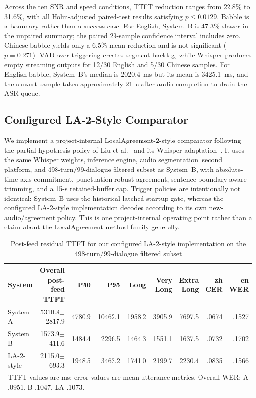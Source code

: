 \documentclass[conference]{IEEEtran}
\begin{document}
Across the ten SNR and speed conditions, TTFT reduction ranges from 22.8\% to 31.6\%, with all Holm-adjusted paired-test results satisfying $p\leq0.0129$. Babble is a boundary rather than a success case. For English, System~B is 47.3\% slower in the unpaired summary; the paired 29-sample confidence interval includes zero. Chinese babble yields only a 6.5\% mean reduction and is not significant ($p=0.271$). VAD over-triggering creates segment backlog, while Whisper produces empty streaming outputs for 12/30 English and 5/30 Chinese samples. For English babble, System~B's median is 2020.4~ms but its mean is 3425.1~ms, and the slowest sample takes approximately 21~s after audio completion to drain the ASR queue.

\subsection{Configured LA-2-Style Comparator}

We implement a project-internal LocalAgreement-2-style comparator following the partial-hypothesis policy of Liu et al.~\cite{liu2020partialhypothesis} and its Whisper adaptation~\cite{machacek2023turning}. It uses the same Whisper weights, inference engine, audio segmentation, second platform, and 498-turn/99-dialogue filtered subset as System~B, with absolute-time-axis commitment, punctuation-robust agreement, sentence-boundary-aware trimming, and a 15-s retained-buffer cap. Trigger policies are intentionally not identical: System~B uses the historical latched startup gate, whereas the configured LA-2-style implementation decodes according to its own new-audio/agreement policy. This is one project-internal operating point rather than a claim about the LocalAgreement method family generally.

\begin{table}[!t]
\caption{Post-feed residual TTFT for our configured LA-2-style implementation on the 498-turn/99-dialogue filtered subset}\label{tab:la}
\centering
\scriptsize
\begin{tabular}{@{}lrrrrrrrr@{}}
\toprule
System & Overall post-feed TTFT & P50 & P95 & Long & Very Long & Extra Long & zh CER & en WER \\
\midrule
System A & 5310.8$\pm$2817.9 & 4780.9 & 10462.1 & 1958.2 & 3905.9 & 7697.5 & .0674 & .1527 \\
System B & 1573.9$\pm$411.6 & 1484.4 & 2296.5 & 1464.3 & 1551.1 & 1637.5 & .0732 & .1702 \\
LA-2-style & 2115.0$\pm$693.3 & 1948.5 & 3463.2 & 1741.0 & 2199.7 & 2230.4 & .0835 & .1566 \\
\bottomrule
\multicolumn{9}{l}{\footnotesize TTFT values are ms; error values are mean-utterance metrics. Overall WER: A .0951, B .1047, LA .1073.}
\end{tabular}
\end{table}
\end{document}
